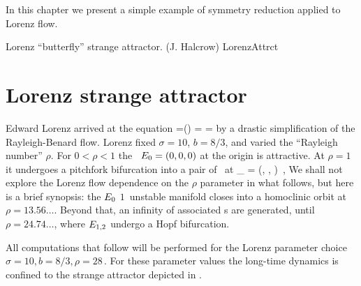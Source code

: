 
In this chapter we present a simple example of symmetry reduction applied to
Lorenz flow.

{Lorenz ``butterfly'' strange attractor.  (J. Halcrow)}
{LorenzAttrct}

\section{Lorenz strange attractor\label{exmp:Lorenz}}
Edward Lorenz arrived at the equation 
\beq
\dot{\ssp}=\pVeloc(\ssp)
    =
    =
by a drastic simplification of
the Rayleigh-Benard flow. %
Lorenz fixed
$\sigma = 10$, $ b= 8/3$,
and varied the ``Rayleigh number'' $\rho$. For
$0 < \rho < 1$ the \eqv\ $E_{0} =(0,0,0)$
at the origin is attractive.
At $ \rho = 1$  it undergoes a pitchfork
bifurcation into a pair of \eqva\ at
\beq
\ssp_{} = (\pm {}, \pm {}, )
\,,
We shall not explore the Lorenz flow dependence on the $\rho$
parameter in what follows, but here is a brief synopsis: the
$E_{0}$  $1$\dmn\ unstable manifold closes into a
homoclinic orbit at $\rho=13.56\dots$. Beyond that, an infinity
of associated \po s are generated, until $\rho = 24.74\dots$,
where $E_{1,2}$ undergo a Hopf bifurcation.

All computations that follow
will be performed for the Lorenz parameter choice
\(
    \sigma = 10, b= 8/3, \rho = 28
\,.
\)
For these parameter values the long-time dynamics is confined to
the strange attractor
depicted in  .

